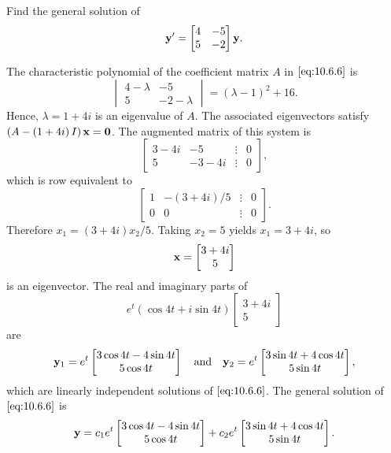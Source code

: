 \documentclass{ximera}
\begin{document}
\begin{example}\label{example:10.6.1}
 Find the general solution of
\begin{equation} \label{eq:10.6.6}
{\bf y}'=\begin{bmatrix}4&-5\\5&-2\end{bmatrix}{\bf y}.
\end{equation}

\begin{explanation} The characteristic polynomial of the coefficient matrix $A$
in $\eqref{eq:10.6.6}$ is
$$
\begin{vmatrix} 4-\lambda&-5\\ 5&-2-\lambda
\end{vmatrix}=(\lambda-1)^2+16.
$$
Hence, $\lambda=1+4i$ is an eigenvalue of $A$. The associated
eigenvectors satisfy $\left(A-\left(1+4i\right)I\right){\bf x}={\bf
0}$. The augmented matrix of this system is
$$
\begin{bmatrix} 3-4i&-5&\vdots&0\\
5&-3-4i&\vdots&0  \end{bmatrix},
 $$
which is row equivalent to
$$
\begin{bmatrix} 1&-(3+4i)/5&\vdots&0\\ 0&0&\vdots&0
\end{bmatrix}.
$$
Therefore $x_1=(3+4i)x_2/5$. Taking $x_2=5$ yields $x_1=3+4i$, so
$$
{\bf x}=\begin{bmatrix}3+4i\\5\end{bmatrix}
$$
is an eigenvector.  The real and imaginary parts of
$$
e^t(\cos4t+i\sin4t)\begin{bmatrix}3+4i\\5\end{bmatrix}
$$
 are
$$
{\bf y}_1=e^t\begin{bmatrix}3\cos4t-4\sin
4t\\5\cos4t\end{bmatrix}\quad\mbox{and}\quad
{\bf y}_2=e^t\begin{bmatrix}3\sin4t+4\cos4t\\5\sin
4t\end{bmatrix},
$$
which are linearly independent solutions of  $\eqref{eq:10.6.6}$.
The general solution of $\eqref{eq:10.6.6}$ is
$$
{\bf y}=
c_1e^t\begin{bmatrix}3\cos4t-4\sin
4t\\5\cos4t\end{bmatrix}+
c_2e^t\begin{bmatrix}3\sin4t+4\cos4t\\5\sin
4t\end{bmatrix}.
$$
\end{explanation}
\end{example}
\end{document}

